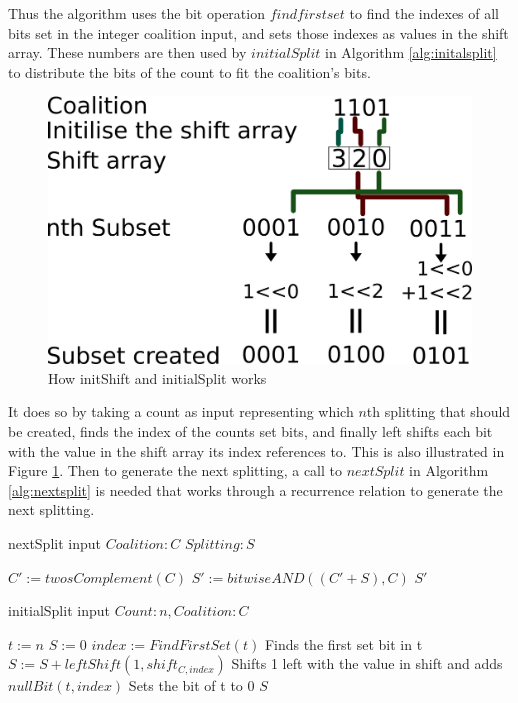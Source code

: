 \documentclass{llncs}
\begin{document}
Thus the algorithm uses the bit operation $find first set$ to find the indexes of all bits set in the integer coalition input, and sets those indexes as values in the shift array. These numbers are then used by $initialSplit$ in Algorithm \ref{alg:initalsplit} to distribute the bits of the count to fit the coalition's bits.
\begin{figure}[htbp]
\centering
\includegraphics[width=0.5\linewidth]{test}
\caption{How initShift and initialSplit works\label{fig:howitworks}}
\end{figure}

It does so by taking a count as input representing which $n$th splitting that should be created, finds the index of the counts  set bits, and finally left shifts each bit with the value in the shift array its index references to. This is also illustrated in Figure \ref{fig:howitworks}. Then to generate the next splitting, a call to $nextSplit$ in Algorithm \ref{alg:nextsplit} is needed that works through a recurrence relation to generate the next splitting.

\begin{algorithm}
\caption{ nextSplit input $Coalition:C$ $Splitting:S$\label{alg:nextsplit}}
\begin{algorithmic}[1]
\STATE $C' := twosComplement(C)$
\STATE $S' := bitwiseAND((C'+S),C)$
\RETURN $S'$
\end{algorithmic}
\end{algorithm}

\begin{algorithm}
\caption{initialSplit input $Count:n, Coalition:C$\label{alg:initalsplit}}
\begin{algorithmic}[1]
\STATE $t := n$
\STATE $S := 0$
 { 
\STATE $index := FindFirstSet(t)$ \hfill Finds the first set bit in t
\STATE $S := S + leftShift(1,shift_{C,index})$ \hfill Shifts 1 left with the value in shift and adds
\STATE $nullBit(t,index)$ \hfill Sets the bit of t to 0
}
\ENDWHILE
\RETURN $S$
\end{algorithmic}
\end{algorithm}
\end{document}
